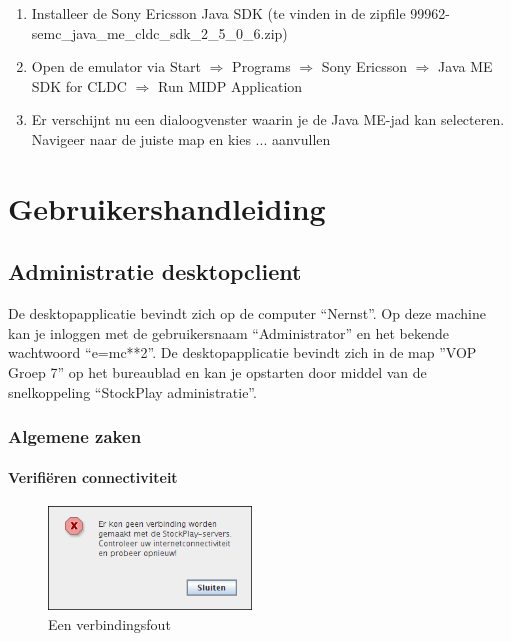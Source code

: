 \begin{enumerate}
\item{Installeer de Sony Ericsson Java SDK (te vinden in de zipfile 99962-semc\_java\_me\_cldc\_sdk\_2\_5\_0\_6.zip)}
\item{Open de emulator via Start $\Rightarrow$ Programs $\Rightarrow$ Sony Ericsson $\Rightarrow$ Java ME SDK for CLDC $\Rightarrow$ Run MIDP Application}
\item{Er verschijnt nu een dialoogvenster waarin je de Java ME-jad kan selecteren. Navigeer naar de juiste map en kies ...}
\todo aanvullen
\end{enumerate}


%
%

\section{Gebruikershandleiding}

\subsection{Administratie desktopclient}

De desktopapplicatie bevindt zich op de computer ``Nernst''.
Op deze machine kan je inloggen met de gebruikersnaam ``Administrator'' en het bekende wachtwoord ``e=mc**2''.
De desktopapplicatie bevindt zich in de map ''VOP Groep 7'' op het bureaublad en kan je opstarten door middel van de snelkoppeling ``StockPlay administratie''.

\subsubsection{Algemene zaken}
\label{sec:handl:admin:algemeen}

\paragraph{Verifi\"eren connectiviteit}
\begin{figure}
	\centering
		\includegraphics[width=0.48\textwidth]{images/handleiding/administratie/verbindingsfout}
	\caption{Een verbindingsfout}
	\label{fig:handl:admin:verbindingsfout}
\end{figure}


